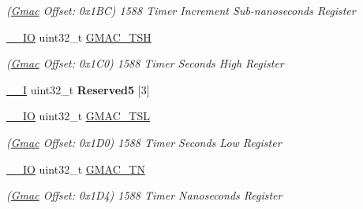 \begin{DoxyCompactItemize}
\begin{DoxyCompactList}\small\item\em (\mbox{\hyperlink{structGmac}{Gmac}} Offset\+: 0x1\+BC) 1588 Timer Increment Sub-\/nanoseconds Register \end{DoxyCompactList}\item 
\mbox{\label{structGmac_a4b0971ad522bb1cd2977fb4db6cdfb91}} 
\mbox{\hyperlink{core__cm7_8h_aec43007d9998a0a0e01faede4133d6be}{\+\_\+\+\_\+\+IO}} uint32\+\_\+t \mbox{\hyperlink{structGmac_a4b0971ad522bb1cd2977fb4db6cdfb91}{G\+M\+A\+C\+\_\+\+T\+SH}}
\begin{DoxyCompactList}\small\item\em (\mbox{\hyperlink{structGmac}{Gmac}} Offset\+: 0x1\+C0) 1588 Timer Seconds High Register \end{DoxyCompactList}\item 
\mbox{\label{structGmac_ae033a61a688d0a8ec8b0c807677ac587}} 
\mbox{\hyperlink{core__cm7_8h_af63697ed9952cc71e1225efe205f6cd3}{\+\_\+\+\_\+I}} uint32\+\_\+t {\bfseries Reserved5} \mbox{[}3\mbox{]}
\item 
\mbox{\label{structGmac_a47b5959e2982c3fbec6e86ef7a7dd8fe}} 
\mbox{\hyperlink{core__cm7_8h_aec43007d9998a0a0e01faede4133d6be}{\+\_\+\+\_\+\+IO}} uint32\+\_\+t \mbox{\hyperlink{structGmac_a47b5959e2982c3fbec6e86ef7a7dd8fe}{G\+M\+A\+C\+\_\+\+T\+SL}}
\begin{DoxyCompactList}\small\item\em (\mbox{\hyperlink{structGmac}{Gmac}} Offset\+: 0x1\+D0) 1588 Timer Seconds Low Register \end{DoxyCompactList}\item 
\mbox{\label{structGmac_a899a8890311eaee75d1cbdbe375564e5}} 
\mbox{\hyperlink{core__cm7_8h_aec43007d9998a0a0e01faede4133d6be}{\+\_\+\+\_\+\+IO}} uint32\+\_\+t \mbox{\hyperlink{structGmac_a899a8890311eaee75d1cbdbe375564e5}{G\+M\+A\+C\+\_\+\+TN}}
\begin{DoxyCompactList}\small\item\em (\mbox{\hyperlink{structGmac}{Gmac}} Offset\+: 0x1\+D4) 1588 Timer Nanoseconds Register \end{DoxyCompactList}\item 
\mbox{\label{structGmac_aee9dbb0e1023ba970c8300bef7221950}} 

\end{DoxyCompactItemize}
